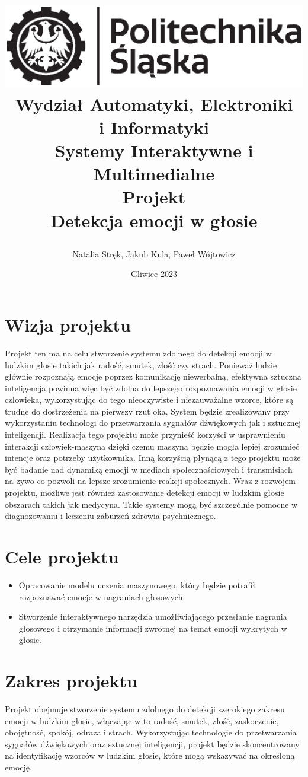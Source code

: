 \documentclass[12pt,titlepage]{article}
\title{
\includegraphics[scale=0.75]{img/politechnika_sl_logo_bw_poziom_pl.eps}\\
\textbf{Wydział Automatyki, Elektroniki\\
i Informatyki}\\
\vspace*{1cm}
Systemy Interaktywne i Multimedialne \\ Projekt \\ Detekcja emocji w głosie

\vspace*{5cm}
}
\author{
Natalia Stręk,
Jakub Kula,
Paweł Wójtowicz
}
\date{Gliwice 2023}
\begin{document}
\maketitle

\tableofcontents

\newpage


\section{Wizja projektu}
Projekt ten ma na celu stworzenie systemu zdolnego do detekcji emocji w ludzkim głosie takich jak radość, smutek, złość czy strach. Ponieważ ludzie głównie rozpoznają emocje poprzez komunikację niewerbalną, efektywna sztuczna inteligencja powinna więc być zdolna do lepszego rozpoznawania emocji w głosie człowieka, wykorzystując do tego nieoczywiste i niezauważalne wzorce, które są trudne do dostrzeżenia na pierwszy rzut oka. System będzie zrealizowany przy wykorzystaniu technologi do przetwarzania sygnałów dźwiękowych jak i sztucznej inteligencji. Realizacja tego projektu może przynieść korzyści w usprawnieniu interakcji człowiek-maszyna dzięki czemu maszyna będzie mogła lepiej zrozumieć intencje oraz potrzeby użytkownika. Inną korzyścią płynącą z tego projektu może być badanie nad dynamiką emocji w mediach społecznościowych i transmisiach na żywo co pozwoli na lepsze zrozumienie reakcji społecznych. Wraz z rozwojem projektu, możliwe jest również zastosowanie detekcji emocji w ludzkim głosie obszarach takich jak medycyna. Takie systemy mogą być szczególnie pomocne w diagnozowaniu i leczeniu zaburzeń zdrowia psychnicznego.

\section{Cele projektu}
\begin{itemize}
    \item Opracowanie modelu uczenia maszynowego, który będzie potrafił rozpoznawać emocje w nagraniach głosowych.
    \item Stworzenie interaktywnego narzędzia umożliwiającego przesłanie nagrania głosowego i otrzymanie informacji zwrotnej na temat emocji wykrytych w głosie.
\end{itemize}

\section{Zakres projektu}
Projekt obejmuje stworzenie systemu zdolnego do detekcji szerokiego zakresu emocji w ludzkim głosie, włączając w to radość, smutek, złość, zaskoczenie, obojętność, spokój, odraza i strach. Wykorzystując technologie do przetwarzania sygnałów dźwiękowych oraz sztucznej inteligencji, projekt będzie skoncentrowany na identyfikację wzorców w ludzkim głosie, które mogą wskazywać na określoną emocję.
\end{document}

